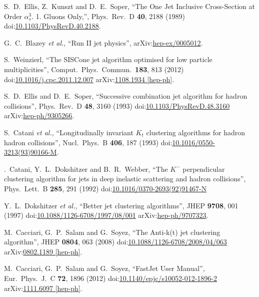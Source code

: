 \begin{thebibliography}{99}
S.~D.~Ellis, Z.~Kunszt and D.~E.~Soper, ``The One Jet Inclusive Cross-Section at Order $\alpha^3_s$. 1. Gluons Only,'', Phys.\ Rev.\ D {\bf 40}, 2188 (1989) doi:\href{http://dx.doi.org/10.1103/PhysRevD.40.2188}{10.1103/PhysRevD.40.2188}.

G.~C.~Blazey {\it et al.}, ``Run II jet physics'', arXiv:\href{https://arxiv.org/abs/hep-ex/0005012}{hep-ex/0005012}.

S.~Weinzierl, ``The SISCone jet algorithm optimised for low particle multiplicities'', Comput.\ Phys.\ Commun.\ {\bf 183}, 813 (2012) doi:\href{http://dx.doi.org/10.1016/j.cpc.2011.12.007}{10.1016/j.cpc.2011.12.007} arXiv:\href{http://arxiv.org/abs/arXiv:1108.1934}{1108.1934 [hep-ph]}.

S.~D.~Ellis and D.~E.~Soper, ``Successive combination jet algorithm for hadron collisions'', Phys.\ Rev.\ D {\bf 48}, 3160 (1993) doi:\href{http://dx.doi.org/10.1103/PhysRevD.48.3160}{10.1103/PhysRevD.48.3160} arXiv:\href{http://arxiv.org/abs/hep-ph/9305266}{hep-ph/9305266}.

S.~Catani {\it et al.}, ``Longitudinally invariant $K_t$ clustering algorithms for hadron hadron collisions'', Nucl.\ Phys.\ B {\bf 406}, 187 (1993) doi:\href{http://dx.doi.org/10.1016/0550-3213(93)90166-M}{10.1016/0550-3213(93)90166-M}.

.~Catani, Y.~L.~Dokshitzer and B.~R.~Webber, ``The $K^-$ perpendicular clustering algorithm for jets in deep inelastic scattering and hadron collisions'', Phys.\ Lett.\ B {\bf 285}, 291 (1992) doi:\href{http://dx.doi.org/10.1016/0370-2693(92)91467-N}{10.1016/0370-2693(92)91467-N}

Y.~L.~Dokshitzer {\it et al.}, ``Better jet clustering algorithms'', JHEP {\bf 9708}, 001 (1997) doi:\href{http://dx.doi.org/10.1088/1126-6708/1997/08/001}{10.1088/1126-6708/1997/08/001} arXiv:\href{http://arxiv.org/abs/hep-ph/9707323}{hep-ph/9707323}.

M.~Cacciari, G.~P.~Salam and G.~Soyez, ``The Anti-k(t) jet clustering algorithm'', JHEP {\bf 0804}, 063 (2008) doi:\href{http://dx.doi.org/10.1088/1126-6708/2008/04/063}{10.1088/1126-6708/2008/04/063} arXiv:\href{http://arxiv.org/abs/arXiv:0802.1189}{0802.1189 [hep-ph]}.

M.~Cacciari, G.~P.~Salam and G.~Soyez, ``FastJet User Manual'', Eur.\ Phys.\ J.\ C {\bf 72}, 1896 (2012) doi:\href{http://dx.doi.org/10.1140/epjc/s10052-012-1896-2}{10.1140/epjc/s10052-012-1896-2} arXiv:\href{http://arxiv.org/abs/arXiv:1111.6097}{1111.6097 [hep-ph]}.



\end{thebibliography}
